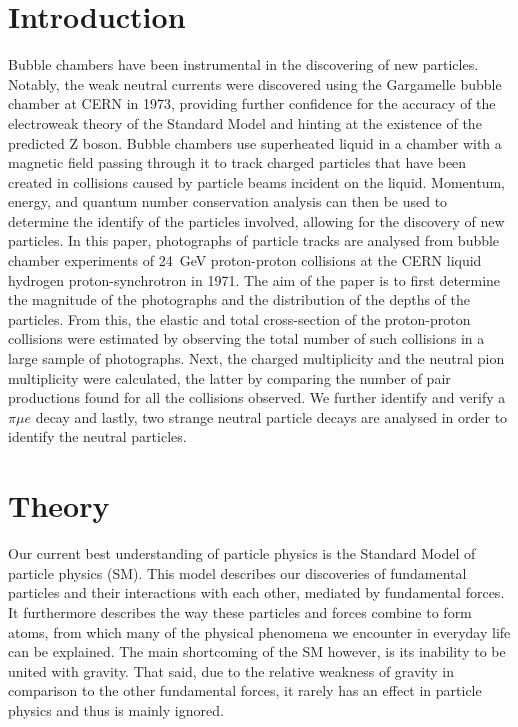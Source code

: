\documentclass[twocolumn]{article}
\begin{document}
\section{Introduction}
Bubble chambers have been instrumental in the discovering of new particles. Notably, the weak neutral currents were discovered using the Gargamelle bubble chamber at CERN in 1973, providing further confidence for the accuracy of the electroweak theory of the Standard Model and hinting at the existence of the predicted Z boson. Bubble chambers use superheated liquid in a chamber with a magnetic field passing through it to track charged particles that have been created in collisions caused by particle beams incident on the liquid. Momentum, energy, and quantum number conservation analysis can then be used to determine the identify of the particles involved, allowing for the discovery of new particles. In this paper, photographs of particle tracks are analysed from bubble chamber experiments of 24~GeV proton-proton collisions at the CERN liquid hydrogen proton-synchrotron in 1971. The aim of the paper is to first determine the magnitude of the photographs and the distribution of the depths of the particles. From this, the elastic and total cross-section of the proton-proton collisions were estimated by observing the total number of such collisions in a large sample of photographs. Next, the charged multiplicity and the neutral pion multiplicity were calculated, the latter by comparing the number of pair productions found for all the collisions observed. We further identify and verify a $\pi\mu e$ decay and lastly, two strange neutral particle decays are analysed in order to identify the neutral particles.

\section{Theory}
Our current best understanding of particle physics is the Standard Model of particle physics (SM). This model describes our discoveries of fundamental particles and their interactions with each other, mediated by fundamental forces. It furthermore describes the way these particles and forces combine to form atoms, from which many of the physical phenomena we encounter in everyday life can be explained. The main shortcoming of the SM however, is its inability to be united with gravity. That said, due to the relative weakness of gravity in comparison to the other fundamental forces, it rarely has an effect in particle physics and thus is mainly ignored.
\end{document}
